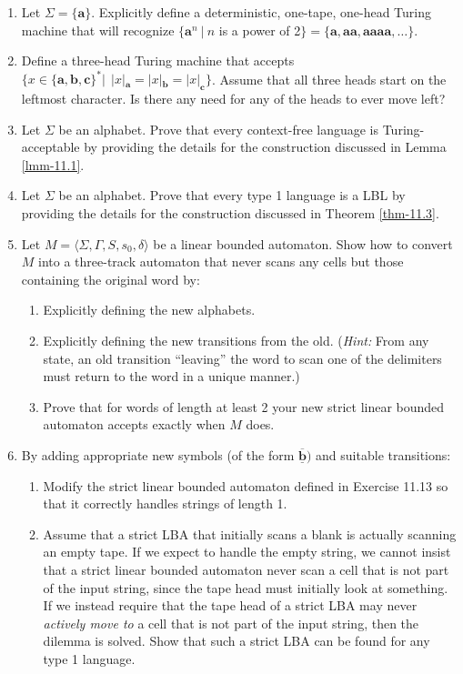 \begin{enumerate}[{11.}1.]
\item Let $\Sigma=\{\pmb{a}\}$. Explicitly define a deterministic, one-tape,
one-head Turing machine that will recognize $\{\pmb{a}^n\ |\ n$ is a power of 2$\}=
\{\pmb{a},\pmb{aa},\pmb{aaaa},\ldots\}$.

\item Define a three-head Turing machine that accepts $\{x\in\{\pmb{a},\pmb{b},
\pmb{c}\}^*|\ \ |x|_{\pmb{a}}=|x|_{\pmb{b}}=|x|_{\pmb{c}}\}$. Assume that all
three heads start on the leftmost character. Is there any need for any of the
heads to ever move left?

\item Let $\Sigma$ be an alphabet. Prove that every context-free language is
Turing-acceptable by providing the details for the construction discussed in
Lemma \ref{lmm-11.1}.

\item Let $\Sigma$ be an alphabet. Prove that every type 1 language is a LBL by
providing the details for the construction discussed in Theorem \ref{thm-11.3}.

\item Let $M=\langle\Sigma,\Gamma,S,s_0,\delta\rangle$ be a linear bounded
automaton. Show how to convert $M$ into a three-track automaton that never scans
any cells but those containing the original word by:
\begin{enumerate}
\item Explicitly defining the new alphabets.
\item Explicitly defining the new transitions from the old. (\emph{Hint:} From
any state, an old transition ``leaving'' the word to scan one of the delimiters
must return to the word in a unique manner.)
\item Prove that for words of length at least 2 your new strict linear bounded
automaton accepts exactly when $M$ does.
\end{enumerate}

\item By adding appropriate new symbols (of the form $\overline{\underline{\pmb{
b}}})$ and suitable transitions:
\begin{enumerate}
\item Modify the strict linear bounded automaton defined in Exercise 11.13 so
that it correctly handles strings of length 1.
\item Assume that a strict LBA that initially scans a blank is actually scanning
an empty tape. If we expect to handle the empty string, we cannot insist that a
strict linear bounded automaton never scan a cell that is not part of the input
string, since the tape head must initially look at something. If we instead
require that the tape head of a strict LBA may never \emph{actively move to} a
cell that is not part of the input string, then the dilemma is solved. Show that
such a strict LBA can be found for any type 1 language.
\end{enumerate}


\end{enumerate}
